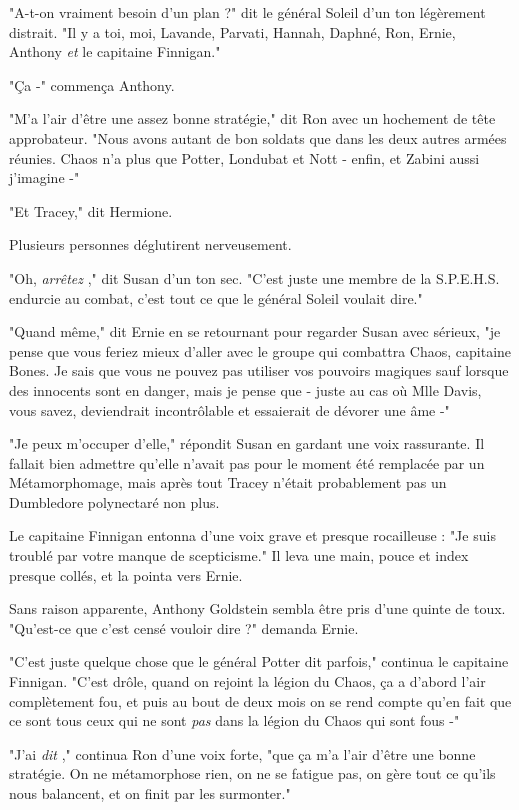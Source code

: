 "A-t-on vraiment besoin d'un plan ?" dit le général Soleil d'un ton légèrement distrait. "Il y a toi, moi, Lavande, Parvati, Hannah, Daphné, Ron, Ernie, Anthony \emph{et}  le capitaine Finnigan."

"Ça -" commença Anthony.

"M'a l'air d'être une assez bonne stratégie," dit Ron avec un hochement de tête approbateur. "Nous avons autant de bon soldats que dans les deux autres armées réunies. Chaos n'a plus que Potter, Londubat et Nott - enfin, et Zabini aussi j'imagine -"

"Et Tracey," dit Hermione.

Plusieurs personnes déglutirent nerveusement.

"Oh, \emph{arrêtez} ," dit Susan d'un ton sec. "C'est juste une membre de la S.P.E.H.S. endurcie au combat, c'est tout ce que le général Soleil voulait dire."

"Quand même," dit Ernie en se retournant pour regarder Susan avec sérieux, "je pense que vous feriez mieux d'aller avec le groupe qui combattra Chaos, capitaine Bones. Je sais que vous ne pouvez pas utiliser vos pouvoirs magiques sauf lorsque des innocents sont en danger, mais je pense que - juste au cas où Mlle Davis, vous savez, deviendrait incontrôlable et essaierait de dévorer une âme -"

"Je peux m'occuper d'elle," répondit Susan en gardant une voix rassurante. Il fallait bien admettre qu'elle n'avait pas pour le moment été remplacée par un Métamorphomage, mais après tout Tracey n'était probablement pas un Dumbledore polynectaré non plus.

Le capitaine Finnigan entonna d'une voix grave et presque rocailleuse : "Je suis troublé par votre manque de scepticisme." Il leva une main, pouce et index presque collés, et la pointa vers Ernie.

Sans raison apparente, Anthony Goldstein sembla être pris d'une quinte de toux. "Qu'est-ce que c'est censé vouloir dire ?" demanda Ernie.

"C'est juste quelque chose que le général Potter dit parfois," continua le capitaine Finnigan. "C'est drôle, quand on rejoint la légion du Chaos, ça a d'abord l'air complètement fou, et puis au bout de deux mois on se rend compte qu'en fait que ce sont tous ceux qui ne sont \emph{pas}  dans la légion du Chaos qui sont fous -"

"J'ai \emph{dit} ," continua Ron d'une voix forte, "que ça m'a l'air d'être une bonne stratégie. On ne métamorphose rien, on ne se fatigue pas, on gère tout ce qu'ils nous balancent, et on finit par les surmonter."

